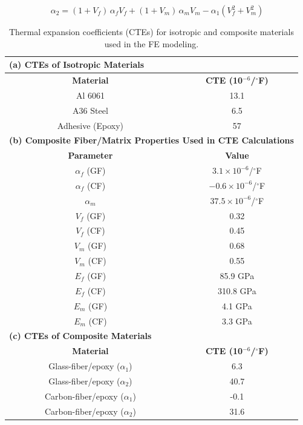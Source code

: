 \documentclass[journal,article,submit,pdftex,moreauthors]{Definitions/mdpi}
\begin{document}
\begin{equation}
\alpha_2 = (1 + V_f)\,\alpha_f V_f 
          + (1 + V_m)\,\alpha_m V_m 
          - \alpha_1 (V_f^2 + V_m^2)
\label{eq:a2}
\end{equation}
\begin{table}[H]
\centering
\renewcommand{\arraystretch}{1.3}
\caption{Thermal expansion coefficients (CTEs) for isotropic and composite materials used in the FE modeling.}
\label{tab:CTE_all}

\begin{tabular}{|c|c|}
\hline
\multicolumn{2}{|l|}{\textbf{(a) CTEs of Isotropic Materials}} \\
\hline
\textbf{Material} & \textbf{CTE (10$^{-6}$/$^\circ$F)} \\
\hline
Al 6061 & 13.1 \\
A36 Steel & 6.5 \\
Adhesive (Epoxy) & 57 \\
\hline

\multicolumn{2}{|l|}{\textbf{(b) Composite Fiber/Matrix Properties Used in CTE Calculations}} \\
\hline
\textbf{Parameter} & \textbf{Value} \\
\hline
$ \alpha_f $ (GF) & $3.1 \times 10^{-6}$/$^\circ$F \\
$ \alpha_f $ (CF) & $-0.6 \times 10^{-6}$/$^\circ$F \\
$ \alpha_m $ & $37.5 \times 10^{-6}$/$^\circ$F \\
$V_f$ (GF) & 0.32 \\
$V_f$ (CF) & 0.45 \\
$V_m$ (GF) & 0.68 \\
$V_m$ (CF) & 0.55 \\
$E_f$ (GF) & 85.9 GPa \\
$E_f$ (CF) & 310.8 GPa \\
$E_m$ (GF) & 4.1 GPa \\
$E_m$ (CF) & 3.3 GPa \\
\hline

\multicolumn{2}{|l|}{\textbf{(c) CTEs of Composite Materials}} \\
\hline
\textbf{Material} & \textbf{CTE (10$^{-6}$/$^\circ$F)} \\
\hline
Glass-fiber/epoxy ($\alpha_1$) & 6.3 \\
Glass-fiber/epoxy ($\alpha_2$) & 40.7 \\
\hline
Carbon-fiber/epoxy ($\alpha_1$) & -0.1 \\
Carbon-fiber/epoxy ($\alpha_2$) & 31.6 \\
\hline

\end{tabular}
\end{table}
\end{document}
